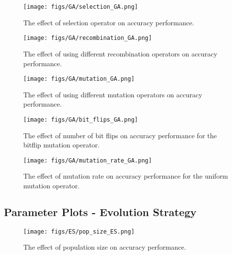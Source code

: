 \documentclass{article}
\begin{document}
\newpage

\begin{figure*}[htbp]
    \centering
    \texttt{[image: figs/GA/selection\_GA.png]}
    \caption{The effect of selection operator on accuracy performance.}
    \label{fig:A_GA_selection}
\end{figure*}

\newpage

\begin{figure*}[htbp]
    \centering
    \texttt{[image: figs/GA/recombination\_GA.png]}
    \caption{The effect of using different recombination operators on accuracy performance.}
    \label{fig:A_GA_recombination}
\end{figure*}

\newpage

\begin{figure*}[htbp]
    \centering
    \texttt{[image: figs/GA/mutation\_GA.png]}
    \caption{The effect of using different mutation operators on accuracy performance.}
    \label{fig:A_GA_mutation}
\end{figure*}

\begin{figure*}[htbp]
    \centering
    \texttt{[image: figs/GA/bit\_flips\_GA.png]}
    \caption{The effect of number of bit flips on accuracy performance for the bitflip mutation operator.}
    \label{fig:A_GA_bitflip}
\end{figure*}

\begin{figure*}[htbp]
    \centering
    \texttt{[image: figs/GA/mutation\_rate\_GA.png]}
    \caption{The effect of mutation rate on accuracy performance for the uniform mutation operator.}
    \label{fig:GA_mutation_rate}
\end{figure*}

\newpage

\subsection{Parameter Plots - Evolution Strategy}
\label{app:params_es}

\begin{figure*}[htbp]
    \centering
    \texttt{[image: figs/ES/pop\_size\_ES.png]}
    \caption{The effect of population size on accuracy performance.}
    \label{fig:A_ES_popsize}
\end{figure*}
\end{document}
